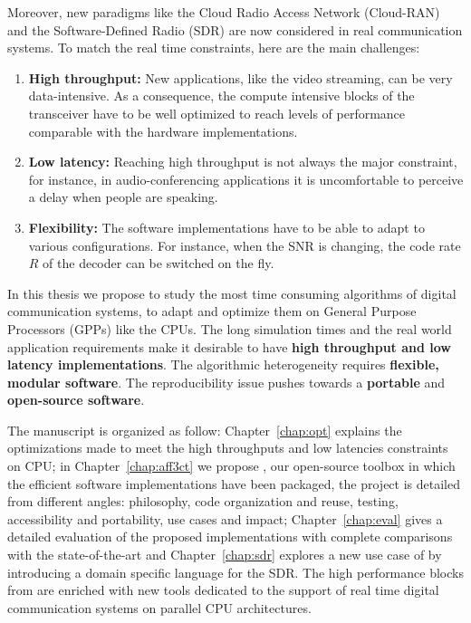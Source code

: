 Moreover, new paradigms like the Cloud Radio Access Network (Cloud-RAN) and the
Software-Defined Radio (SDR) are now considered in real communication systems.
To match the real time constraints, here are the main challenges:

\begin{enumerate}
  \item \textbf{High throughput:} New applications, like the video streaming,
    can be very data-intensive. As a consequence, the compute intensive blocks
    of the transceiver have to be well optimized to reach levels of performance
    comparable with the hardware implementations.
  \item \textbf{Low latency:} Reaching high throughput is not always the major
    constraint, for instance, in audio-conferencing applications it is
    uncomfortable to perceive a delay when people are speaking.
  \item \textbf{Flexibility:} The software implementations have to be able to
    adapt to various configurations. For instance, when the SNR is changing,
    the code rate $R$ of the decoder can be switched on the fly.
\end{enumerate}

In this thesis we propose to study the most time consuming algorithms of digital
communication systems, to adapt and optimize them on General Purpose Processors
(GPPs) like the CPUs. The long simulation times and the real world application
requirements make it desirable to have \textbf{high throughput and low latency
implementations}. The algorithmic heterogeneity requires \textbf{flexible,
modular software}. The reproducibility issue pushes towards a \textbf{portable}
and \textbf{open-source software}.

The manuscript is organized as follow: Chapter~\ref{chap:opt} explains the
optimizations made to meet the high throughputs and low latencies constraints on
CPU; in Chapter~\ref{chap:aff3ct} we propose \AFFECT, our open-source toolbox in
which the efficient software implementations have been packaged, the project is
detailed from different angles: philosophy, code organization and reuse,
testing, accessibility and portability, use cases and impact;
Chapter~\ref{chap:eval} gives a detailed evaluation of the proposed
implementations with complete comparisons with the state-of-the-art and
Chapter~\ref{chap:sdr} explores a new use case of \AFFECT by introducing a
domain specific language for the SDR. The high performance blocks from \AFFECT
are enriched with new tools dedicated to the support of real time digital
communication systems on parallel CPU architectures.

